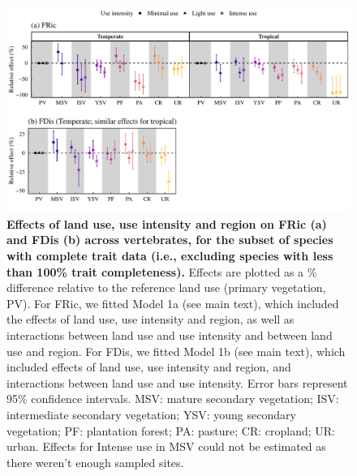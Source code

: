 \begin{figure}[h!]
\centering
\includegraphics[scale=0.7]{Supporting/Chapter3/Figures/SI_Figure18}
\caption[Effects of land use, use intensity and region on FRic (a) and FDis (b) across vertebrates, for the subset of species with complete trait data]{\textbf{Effects of land use, use intensity and region on FRic (a) and FDis (b) across vertebrates, for the subset of species with complete trait data (i.e., excluding species with less than 100\% trait completeness).} Effects are plotted as a \% difference relative to the reference land use (primary vegetation, PV). For FRic, we fitted Model 1a (see main text), which included the effects of land use, use intensity and region, as well as interactions between land use and use intensity and between land use and region. For FDis, we fitted Model 1b (see main text), which included effects of land use, use intensity and region, and interactions between land use and use intensity. Error bars represent 95\% confidence intervals. MSV: mature secondary vegetation; ISV: intermediate secondary vegetation; YSV: young secondary vegetation; PF: plantation forest; PA: pasture; CR: cropland; UR: urban. Effects for Intense use in MSV could not be estimated as there weren’t enough sampled sites.}
\label{}
\end{figure}

